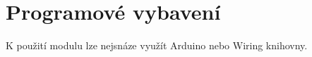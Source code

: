 \documentclass[12pt,a4paper,oneside]{article}
\begin{document}
\newpage

\section{Programové vybavení}
K použití modulu lze nejsnáze využít Arduino nebo Wiring knihovny. 

\begin{thebibliography}{99}

\end{thebibliography}
\end{document}
